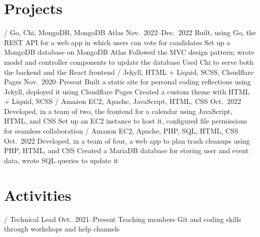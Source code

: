 \section{Projects}
\begin{doutline}
     / Go, Chi, MongoDB, MongoDB Atlas
    \hfill Nov.\ 2022--Dec.\ 2022
        \2 Built, using Go, the REST API for a web app in which users can vote for candidates
        \2 Set up a MongoDB database on MongoDB Atlas
        \2 Followed the MVC design pattern; wrote model and controller components to update the database
        \2 Used Chi to serve both the backend and the React frontend
     / Jekyll, HTML + Liquid, SCSS, Cloudflare Pages
    \hfill Nov.\ 2020--Present
        \2 Built a static site for personal coding reflections using Jekyll, deployed it using Cloudflare Pages
            \3 Created a custom theme with HTML + Liquid, SCSS
     / Amazon EC2, Apache, JavaScript, HTML, CSS
    \hfill Oct.\ 2022
        \2 Developed, in a team of two, the frontend for a calendar using JavaScript, HTML, and CSS
        \2 Set up an EC2 instance to host it, configured file permissions for seamless collaboration
    \1[Trashfree] / Amazon EC2, Apache, PHP, SQL, HTML, CSS
    \hfill Oct.\ 2022
        \2 Developed, in a team of four, a web app to plan trash cleanups using PHP, HTML, and CSS
        \2 Created a MariaDB database for storing user and event data, wrote SQL queries to update it
\end{doutline}

\section{Activities}
\begin{doutline}
     / Technical Lead
    \hfill Oct.\ 2021--Present
        \2 Teaching members Git and coding skills through workshops and help channels
\end{doutline}
